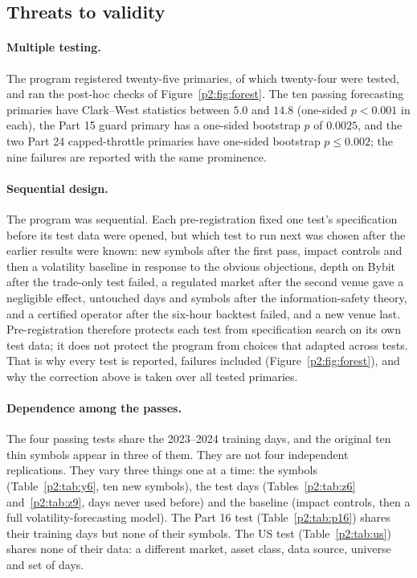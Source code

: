 \subsection{Threats to validity}\label{p2:sec:threats}
\paragraph{Multiple testing.} The program registered twenty-five primaries, of which twenty-four were tested, and ran the post-hoc checks of Figure~\ref{p2:fig:forest}. The ten passing forecasting primaries have Clark--West statistics between $5.0$ and $14.8$ (one-sided $p<0.001$ in each), the Part 15 guard primary has a one-sided bootstrap $p$ of $0.0025$, and the two Part 24 capped-throttle primaries have one-sided bootstrap $p\le 0.002$; the nine failures are reported with the same prominence.

\paragraph{Sequential design.} The program was sequential. Each pre-registration fixed one test's specification before its test data were opened, but which test to run next was chosen after the earlier results were known: new symbols after the first pass, impact controls and then a volatility baseline in response to the obvious objections, depth on Bybit after the trade-only test failed, a regulated market after the second venue gave a negligible effect, untouched days and symbols after the information-safety theory, and a certified operator after the six-hour backtest failed, and a new venue last. Pre-registration therefore protects each test from specification search on its own test data; it does not protect the program from choices that adapted across tests. That is why every test is reported, failures included (Figure~\ref{p2:fig:forest}), and why the correction above is taken over all tested primaries.

\paragraph{Dependence among the passes.} The four passing tests share the 2023--2024 training days, and the original ten thin symbols appear in three of them. They are not four independent replications. They vary three things one at a time: the symbols (Table~\ref{p2:tab:y6}, ten new symbols), the test days (Tables~\ref{p2:tab:z6} and~\ref{p2:tab:z9}, days never used before) and the baseline (impact controls, then a full volatility-forecasting model). The Part 16 test (Table~\ref{p2:tab:p16}) shares their training days but none of their symbols. The US test (Table~\ref{p2:tab:us}) shares none of their data: a different market, asset class, data source, universe and set of days.

